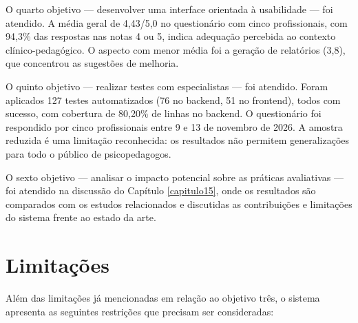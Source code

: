 O quarto objetivo — desenvolver uma interface orientada à usabilidade — foi atendido. A média geral de 4,43/5,0 no questionário com cinco profissionais, com 94,3\% das respostas nas notas 4 ou 5, indica adequação percebida ao contexto clínico-pedagógico. O aspecto com menor média foi a geração de relatórios (3,8), que concentrou as sugestões de melhoria.

O quinto objetivo — realizar testes com especialistas — foi atendido. Foram aplicados 127 testes automatizados (76 no backend, 51 no frontend), todos com sucesso, com cobertura de 80,20\% de linhas no backend. O questionário foi respondido por cinco profissionais entre 9 e 13 de novembro de 2026. A amostra reduzida é uma limitação reconhecida: os resultados não permitem generalizações para todo o público de psicopedagogos.

O sexto objetivo — analisar o impacto potencial sobre as práticas avaliativas — foi atendido na discussão do Capítulo \ref{capitulo15}, onde os resultados são comparados com os estudos relacionados e discutidas as contribuições e limitações do sistema frente ao estado da arte.

\section{Limitações}

Além das limitações já mencionadas em relação ao objetivo três, o sistema apresenta as seguintes restrições que precisam ser consideradas:

